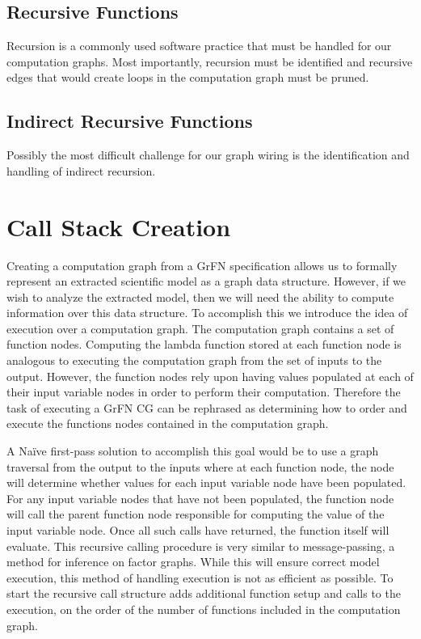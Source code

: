 \subsection{Recursive Functions\label{sec:rec_func}}
Recursion is a commonly used software practice that must be handled for our computation graphs. Most importantly, recursion must be identified and recursive edges that would create loops in the computation graph must be pruned.

\subsection{Indirect Recursive Functions\label{sec:ind_rec_func}}
Possibly the most difficult challenge for our graph wiring is the identification and handling of indirect recursion.

\section{Call Stack Creation\label{sec:call_stack}}

Creating a computation graph from a GrFN specification allows us to formally represent an extracted scientific model as a graph data structure. However, if we wish to analyze the extracted model, then we will need the ability to compute information over this data structure. To accomplish this we introduce the idea of execution over a computation graph. The computation graph contains a set of function nodes. Computing the lambda function stored at each function node is analogous to executing the computation graph from the set of inputs to the output. However, the function nodes rely upon having values populated at each of their input variable nodes in order to perform their computation. Therefore the task of executing a GrFN CG can be rephrased as determining how to order and execute the functions nodes contained in the computation graph.

A Naïve first-pass solution to accomplish this goal would be to use a graph traversal from the output to the inputs where at each function node, the node will determine whether values for each input variable node have been populated. For any input variable nodes that have not been populated, the function node will call the parent function node responsible for computing the value of the input variable node. Once all such calls have returned, the function itself will evaluate. This recursive calling procedure is very similar to message-passing, a method for inference on factor graphs. While this will ensure correct model execution, this method of handling execution is not as efficient as possible. To start the recursive call structure adds additional function setup and calls to the execution, on the order of the number of functions included in the computation graph.

